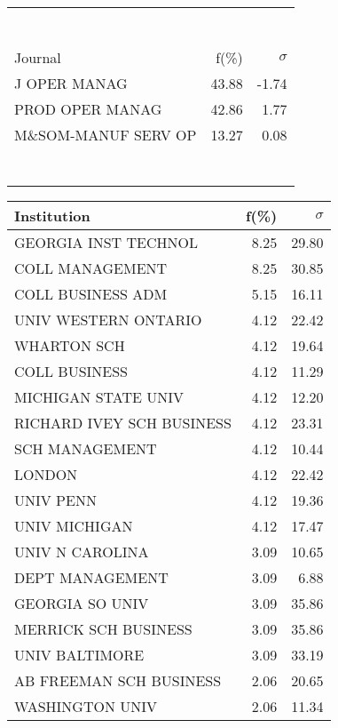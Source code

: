 \documentclass[a4paper,11pt]{report}
\begin{document}
\begin{landscape}
\begin{table}[!ht]
{\begin{tabular}{|l r r|}
 &  & \\
 &  & \\
 &  & \\
 &  & \\
 &  & \\
 &  & \\
 &  & \\
\hline
\hline
Journal & f(\%) & $\sigma$\\
\hline
J OPER MANAG & 43.88 & -1.74\\
PROD OPER MANAG & 42.86 & 1.77\\
M\&SOM-MANUF SERV OP & 13.27 & 0.08\\
 &  & \\
 &  & \\
 &  & \\
 &  & \\
 &  & \\
 &  & \\
 &  & \\
\hline
\end{tabular}
}
{\scriptsize\begin{tabular}{|l r r|}
\hline
Institution & f(\%) & $\sigma$\\
\hline
GEORGIA INST TECHNOL & 8.25 & 29.80\\
COLL MANAGEMENT & 8.25 & 30.85\\
COLL BUSINESS ADM & 5.15 & 16.11\\
UNIV WESTERN ONTARIO & 4.12 & 22.42\\
WHARTON SCH & 4.12 & 19.64\\
COLL BUSINESS & 4.12 & 11.29\\
MICHIGAN STATE UNIV & 4.12 & 12.20\\
RICHARD IVEY SCH BUSINESS & 4.12 & 23.31\\
SCH MANAGEMENT & 4.12 & 10.44\\
LONDON & 4.12 & 22.42\\
UNIV PENN & 4.12 & 19.36\\
UNIV MICHIGAN & 4.12 & 17.47\\
UNIV N CAROLINA & 3.09 & 10.65\\
DEPT MANAGEMENT & 3.09 & 6.88\\
GEORGIA SO UNIV & 3.09 & 35.86\\
MERRICK SCH BUSINESS & 3.09 & 35.86\\
UNIV BALTIMORE & 3.09 & 33.19\\
AB FREEMAN SCH BUSINESS & 2.06 & 20.65\\
WASHINGTON UNIV & 2.06 & 11.34\\

\end{tabular}}
\end{table}
\end{landscape}
\end{document}
